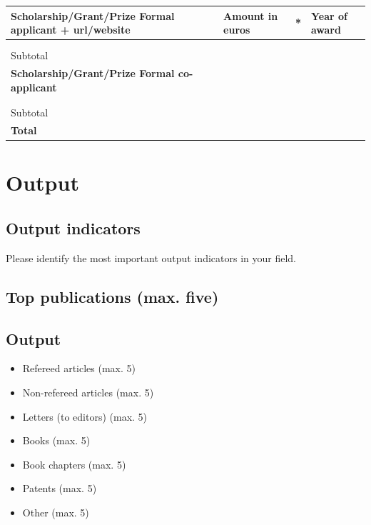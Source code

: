 \documentclass[10pt]{article}
\newcommand{\tableheadfont}{\bfseries\fontsize{10}{10}\selectfont\leavevmode\color{tableblue}}
\begin{document}
	\noindent
	\begin{tabularx}{\linewidth}{|X|X|X|X|}
		\hline
		\tableheadfont Scholarship/Grant/Prize Formal applicant + url/website & \tableheadfont Amount in euros & \tableheadfont * &	\tableheadfont Year of award \\\hline
		& & & \\\hline
		& & & \\\hline
		\color{tableblue} Subtotal & & & \\\hline
		\tableheadfont Scholarship/Grant/Prize Formal co-
		applicant & & & \\\hline
		& & & \\\hline
		& & & \\\hline
		\color{tableblue} Subtotal & & & \\\hline
		\tableheadfont Total & & & \\\hline		
	\end{tabularx}
	\section{Output}
	
	\subsection{Output indicators}
	
	Please identify the most important output indicators in your field.
	
	\subsection{Top publications (max. five)}
	
	\subsection{Output}
	
	\begin{itemize}[label={--}]
		\color{tableblue}
		\setlength\itemsep{0em}
		\item Refereed articles (max. 5)
		\item Non-refereed articles (max. 5)
		\item Letters (to editors) (max. 5)
		\item Books (max. 5)
		\item Book chapters (max. 5)
		\item Patents (max. 5)
		\item Other (max. 5)
	\end{itemize}

	
\end{document}
